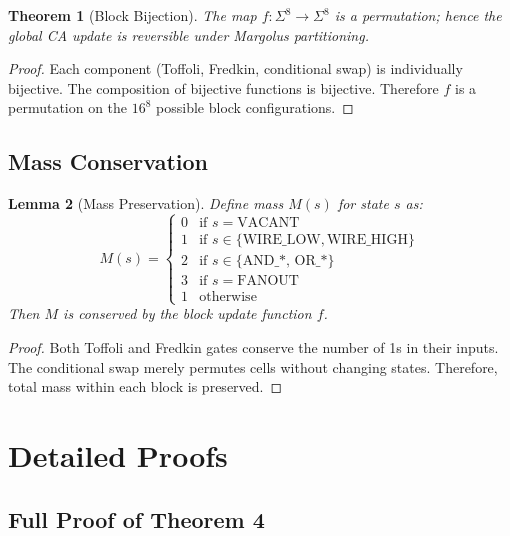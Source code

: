 \documentclass[11pt]{article}
\theoremstyle{plain}
\newtheorem{theorem}{Theorem}
\newtheorem{lemma}[theorem]{Lemma}
\theoremstyle{definition}
\theoremstyle{remark}
\begin{document}
\begin{theorem}[Block Bijection]
\label{thm:block-bijective}
The map $f:\Sigma^{8}\to\Sigma^{8}$ is a permutation; hence the global
CA update is reversible under Margolus partitioning.
\end{theorem}

\begin{proof}
Each component (Toffoli, Fredkin, conditional swap) is individually bijective.
The composition of bijective functions is bijective. Therefore $f$ is a permutation
on the $16^8$ possible block configurations.
\end{proof}

\subsection{Mass Conservation}

\begin{lemma}[Mass Preservation]
Define mass $M(s)$ for state $s$ as:
\[
M(s) = \begin{cases}
0 & \text{if } s = \text{VACANT} \\
1 & \text{if } s \in \{\text{WIRE\_LOW}, \text{WIRE\_HIGH}\} \\
2 & \text{if } s \in \{\text{AND\_*, OR\_*}\} \\
3 & \text{if } s = \text{FANOUT} \\
1 & \text{otherwise}
\end{cases}
\]
Then $M$ is conserved by the block update function $f$.
\end{lemma}

\begin{proof}
Both Toffoli and Fredkin gates conserve the number of 1s in their inputs.
The conditional swap merely permutes cells without changing states.
Therefore, total mass within each block is preserved.
\end{proof}

\section{Detailed Proofs}
\label{app:proofs}

\subsection{Full Proof of Theorem 4}
\end{document}
